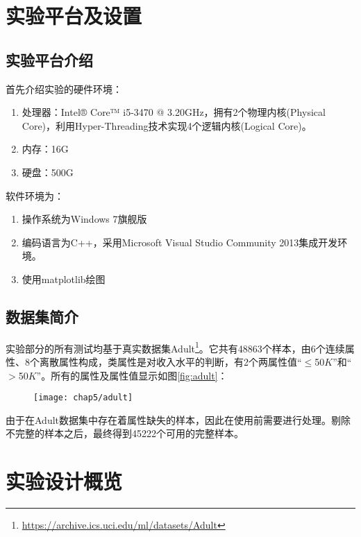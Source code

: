 \section{实验平台及设置}

\subsection{实验平台介绍}

首先介绍实验的硬件环境：
\begin{enumerate}
	\item 处理器：Intel® Core™ i5-3470 @ 3.20GHz，拥有2个物理内核(Physical Core)，利用Hyper-Threading技术实现4个逻辑内核(Logical Core)。
	\item 内存：16G
	\item 硬盘：500G
\end{enumerate}

软件环境为：
\begin{enumerate}
	\item 操作系统为Windows 7旗舰版
	\item 编码语言为C++，采用Microsoft Visual Studio Community 2013集成开发环境。
	\item 使用matplotlib绘图
\end{enumerate}

\subsection{数据集简介}

实验部分的所有测试均基于真实数据集Adult\footnote{\url{https://archive.ics.uci.edu/ml/datasets/Adult}}\cite{adult}。它共有48863个样本，由6个连续属性、8个离散属性构成，类属性是对收入水平的判断，有2个两属性值“$\leqslant$50$K$”和“$>$50$K$”。所有的属性及属性值显示如图\ref{fig:adult}：

\begin{figure}[!htp]
	\centering
	\texttt{[image: chap5/adult]}
\end{figure}

由于在Adult数据集中存在着属性缺失的样本，因此在使用前需要进行处理。剔除不完整的样本之后，最终得到45222个可用的完整样本。

\section{实验设计概览}


